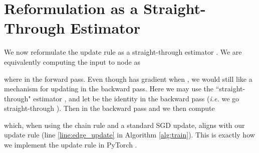 \documentclass{article}
\begin{document}
\section{Reformulation as a Straight-Through Estimator} \label{sec:st}
We now reformulate the update rule as a straight-through estimator \cite{st,gs}. We are equivalently computing the input to node  as

where  in the forward pass. Even though  has gradient  when , we would still like a mechanism for updating  in the backward pass. Here we may use the ``straight-through" estimator \cite{st}, and let  be the identity in the backward pass (\textit{i.e.} we go straight-through ). Then  in the backward pass and we then compute




which, when using the chain rule and a standard SGD update, aligns with our update rule (line \ref{line:edge_update} in Algorithm \ref{alg:train}). This is exactly how we implement the update rule in PyTorch \cite{paszke2017automatic}.
\end{document}
